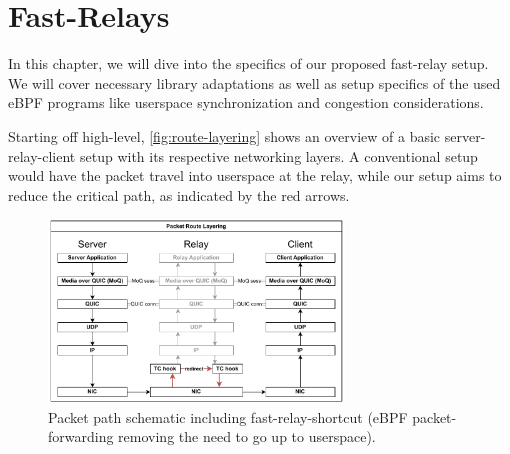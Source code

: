 
\chapter{Fast-Relays}\label{chap:fast_relays}

In this chapter, we will dive into the specifics of our proposed fast-relay setup.
We will cover necessary library adaptations as well as setup specifics of the used 
eBPF programs like userspace synchronization and congestion considerations.

Starting off high-level, \autoref{fig:route-layering} shows an overview of a basic 
server-relay-client setup with its respective networking layers.
A conventional setup would have the packet travel into userspace at the relay, 
while our setup aims to reduce the critical path, as indicated by the red arrows.

\vspace{0.5cm}
\begin{figure}[htbp] %
    \centering
    \includegraphics[width=0.7\textwidth]{figures/03_fast_relays/route-layering.drawio.pdf}
    \caption[Packet path schematic regarding network stack]{Packet path schematic including 
    fast-relay-shortcut (eBPF packet-forwarding removing the need to go up to userspace).}\label{fig:route-layering}
\end{figure}








